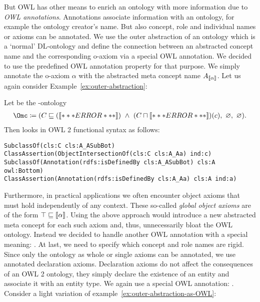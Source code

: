 But OWL has other means to enrich an ontology with more information due to \emph{OWL
  annotations}. Annotations associate information with an ontology, for example the ontology
creator's name. But also concept, role and individual names or axioms can be annotated. We use the
outer abstraction of an ontology which is a `normal' DL-ontology and define the connection between
an abstracted concept name and the corresponding o-axiom via a special OWL annotation. We decided to
use the predefined OWL annotation property \rdfsIsDefinedBy for that purpose. We simply
annotate the o-axiom $\alpha$ with the abstracted meta concept name $A_{\llbracket\alpha\rrbracket}$.
%
Let us again consider Example~\ref{ex:outer-abstraction}:
\begin{example}\label{ex:outer-abstraction-as-OWL}
  Let \Omc be the \ALCALC-ontology
  \begin{align*}
    \Omc \coloneqq (C\sqsubseteq(\oax{A\sqsubseteq\bot})\ \land\ (C\sqcap\oax{A(a)})(c),\ \emptyset,\ \emptyset).
  \end{align*}
Then \Omc looks in OWL 2 functional syntax as follows:

\smallskip\noindent
\verb+SubclassOf(cls:C cls:A_ASubBot)+\\
\verb+ClassAssertion(ObjectIntersectionOf(cls:C cls:A_Aa) ind:c)+\\
\verb+SubclassOf(Annotation(rdfs:isDefinedBy cls:A_ASubBot) cls:A owl:Bottom)+\\
\verb+ClassAssertion(Annotation(rdfs:isDefinedBy cls:A_Aa) cls:A ind:a)+
\end{example}

Furthermore, in practical applications we often encounter object axioms that must hold independently
of any context. These so-called \emph{global object axioms} are of the form
$\top \sqsubseteq \llbracket\alpha\rrbracket$. Using the above approach would introduce a new abstracted meta concept
for each such axiom and, thus, unnecessarily bloat the OWL ontology. Instead we decided to handle
another OWL annotation with a special meaning: \rdfsLabelGlobal.
%
At last, we need to specify which concept and role names are rigid. Since only the ontology as whole
or single axioms can be annotated, we use annotated declaration axioms. Declaration axioms do not
affect the consequences of an OWL 2 ontology, they simply declare the existence of an entity and
associate it with an entity type. We again use a special OWL annotation: \rdfsLabelRigid.
%
Consider a light variation of example~\ref{ex:outer-abstraction-as-OWL}:

